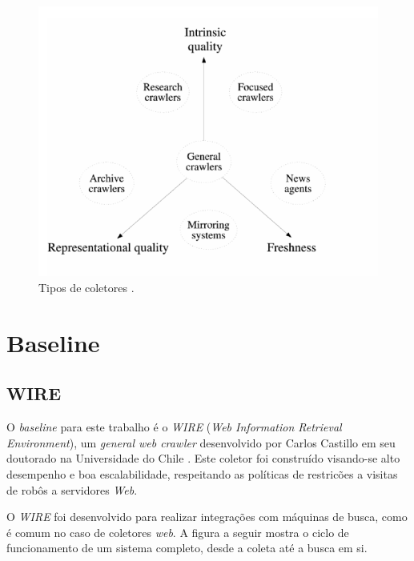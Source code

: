 \documentclass[a4paper,12pt,titlepage]{article}
\begin{document}
\begin{figure}[H]
     \centering
     \includegraphics[scale=0.4]{figures/crawlers-types.png}
     \caption{Tipos de coletores \cite{carlos}.}
     \label{bsp}
\end{figure}



\section{Baseline}

\subsection{WIRE}

O \textit{baseline} para este trabalho é o \textit{WIRE} (\textit{Web Information Retrieval Environment}), um \textit{general web crawler} desenvolvido por Carlos Castillo em seu doutorado na Universidade do Chile \cite{carlos}. Este coletor foi construído visando-se alto desempenho e boa escalabilidade, respeitando as políticas de restricões a visitas de robôs a servidores \textit{Web}.

O \textit{WIRE} foi desenvolvido para realizar integrações com máquinas de busca, como é comum no caso de coletores \textit{web}. A figura a seguir mostra o ciclo de funcionamento de um sistema completo, desde a coleta até a busca em si.
\end{document}
